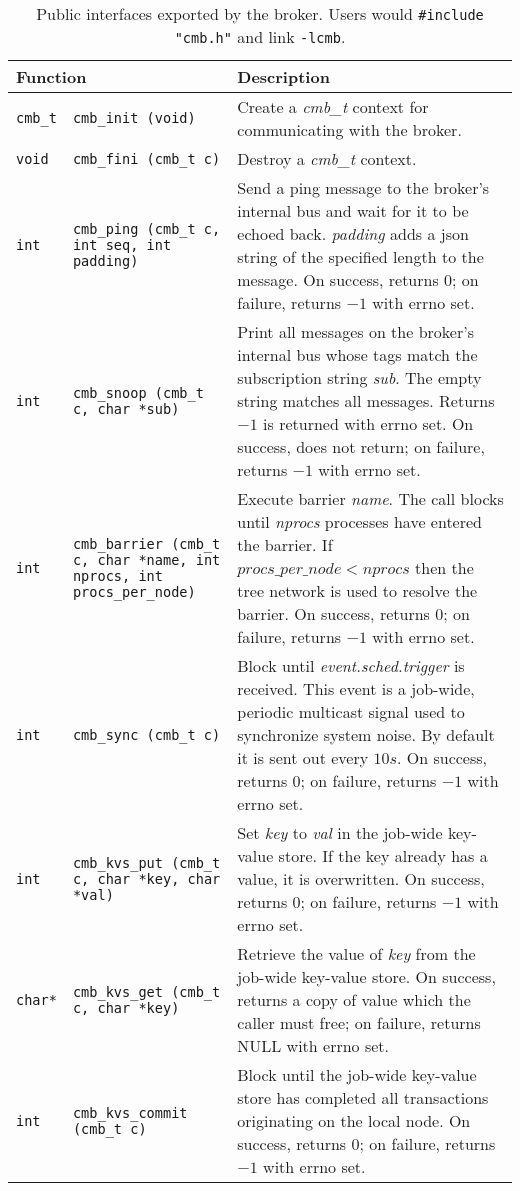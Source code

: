 \begin{table}
\centering
\begin{tabular}{|p{0.7cm}p{5cm}|p{9cm}|}\hline
\multicolumn{2}{|l|}{\textbf{Function}}
  & \textbf{Description} \\
\hline
{\tt cmb\_t} & {\tt cmb\_init (void)}
  & Create a {\em cmb\_t} context for communicating with the broker.\\
{\tt void} & {\tt cmb\_fini (cmb\_t c)}
  & Destroy a {\em cmb\_t} context.\\
\hline
{\tt int} & {\tt cmb\_ping (cmb\_t c, int seq, int padding)}
  & Send a ping message to the broker's internal bus and wait for it
    to be echoed back.  {\em padding} adds a json string of the specified
    length to the message.
    On success, returns $0$; on failure, returns $-1$ with errno set.\\
\hline
{\tt int} & {\tt cmb\_snoop (cmb\_t c, char {*sub})}
  & Print all messages on the broker's internal bus whose tags match the
    subscription string {\em sub}.  The empty string matches all messages.
    Returns $-1$ is returned with errno set.
    On success, does not return; on failure, returns $-1$ with errno set.\\
\hline
{\tt int}
  & {\tt cmb\_barrier (cmb\_t c, char {*name}, int nprocs,
                       int procs\_per\_node)}
  & Execute barrier {\em name}.  The call blocks until {\em nprocs}
    processes have entered the barrier.  If $procs\_per\_node < nprocs$
    then the tree network is used to resolve the barrier.
    On success, returns $0$; on failure, returns $-1$ with errno set.\\
\hline
{\tt int}
  & {\tt cmb\_sync (cmb\_t c)}
  & Block until {\em event.sched.trigger} is received.  This event is
    a job-wide, periodic multicast signal used to synchronize system noise.
    By default it is sent out every $10s$.
    On success, returns $0$; on failure, returns $-1$ with errno set.\\
\hline
{\tt int}
  & {\tt cmb\_kvs\_put (cmb\_t c, char {*key}, char {*val})}
  & Set {\em key} to {\em val} in the job-wide key-value store.
    If the key already has a value, it is overwritten.
    On success, returns $0$; on failure, returns $-1$ with errno set.\\
{\tt {char*}}
  & {\tt cmb\_kvs\_get (cmb\_t c, char {*key})}
  & Retrieve the value of {\em key} from the job-wide key-value store.
    On success, returns a copy of value which the caller must free;
    on failure, returns NULL with errno set.\\
{\tt int}
  & {\tt cmb\_kvs\_commit (cmb\_t c)}
  & Block until the job-wide key-value store has completed all transactions
    originating on the local node.
    On success, returns $0$; on failure, returns $-1$ with errno set.\\
\hline
\end{tabular}
\caption{Public interfaces exported by the broker.  Users would
{\tt \#include "cmb.h"} and link {\tt -lcmb}.}
\label{fig:cmbapi}
\end{table}


